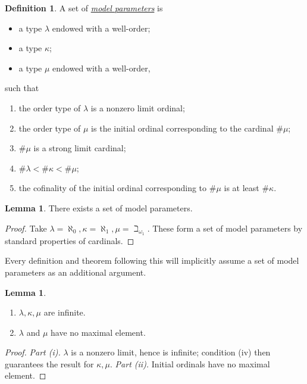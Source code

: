 \documentclass{article}
\newcommand{\cdef}[3]{\href{https://leanprover-community.github.io/con-nf/doc/ConNF/#1.html\#ConNF.#2}{\emph{#3}}}
\theoremstyle{definition}
\newtheorem{definition}{Definition}[section]
\newtheorem{lemma}[theorem]{Lemma}
\theoremstyle{remark}
\begin{document}
\begin{definition}
    \label{def:params}
    A set of \cdef{BaseType/Params}{Params}{model parameters} is
    \begin{itemize}
        \item a type \( \lambda \) endowed with a well-order;
        \item a type \( \kappa \);
        \item a type \( \mu \) endowed with a well-order,
    \end{itemize}
    such that
    \begin{enumerate}
        \item the order type of \( \lambda \) is a nonzero limit ordinal;
        \item the order type of \( \mu \) is the initial ordinal corresponding to the cardinal \( \#\mu \);
        \item \( \#\mu \) is a strong limit cardinal;
        \item \( \#\lambda < \#\kappa < \#\mu \);
        \item the cofinality of the initial ordinal corresponding to \( \#\mu \) is at least \( \#\kappa \).
    \end{enumerate}
\end{definition}
\begin{lemma}
    There exists a set of model parameters.
\end{lemma}
\begin{proof}
    Take \( \lambda = \aleph_0, \kappa = \aleph_1, \mu = \beth_{\omega_1} \).
    These form a set of model parameters by standard properties of cardinals.
\end{proof}
Every definition and theorem following this will implicitly assume a set of model parameters as an additional argument.
\begin{lemma}
    \label{lem:infinite_no_max_model_params}
    \begin{enumerate}
        \item \( \lambda, \kappa, \mu \) are infinite.
        \item \( \lambda \) and \( \mu \) have no maximal element.
    \end{enumerate}
\end{lemma}
\begin{proof}
    \emph{Part (i).}
    \( \lambda \) is a nonzero limit, hence is infinite; condition (iv) then guarantees the result for \( \kappa, \mu \).
    \emph{Part (ii).}
    Initial ordinals have no maximal element.
\end{proof}
\end{document}
